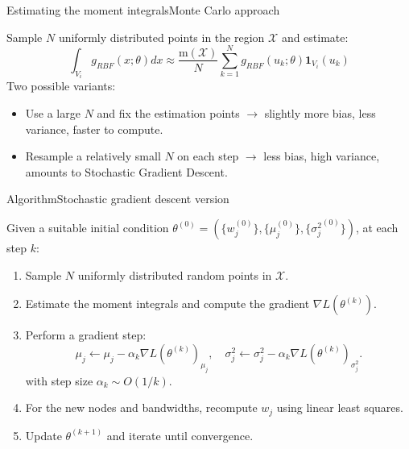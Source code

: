 \documentclass[aspectratio=169]{beamer}
\begin{document}
\begin{frame}{Estimating the moment integrals}{Monte Carlo approach}

	Sample $N$ uniformly distributed points in the region $\mathcal{X}$ and estimate:
	\begin{equation*}
		\int_{V_i} g_{RBF}(x;\theta)dx \approx \frac{\mathrm{m}(\mathcal{X})}{N}\sum_{k=1}^N g_{RBF}(u_k;\theta)\mathbf{1}_{V_i}(u_k)
	\end{equation*}
\pause
	\alert{Two possible variants:}

	\begin{itemize}
		\item Use a large $N$ and fix the estimation points $\to$ slightly more bias, less variance, faster to compute.
		\item Resample a relatively small $N$ on each step $\to$ less bias, high variance, amounts to Stochastic Gradient Descent.
	\end{itemize}
\end{frame}
	
\begin{frame}{Algorithm}{Stochastic gradient descent version}

	Given a suitable initial condition $\theta^{(0)} = (\{w_j^{(0)}\},\{\mu_j^{(0)}\},\{{\sigma_j^2}^{(0)}\})$, at each step $k$:

	\vfill 
	\begin{enumerate}
		\item Sample $N$ uniformly distributed random points in $\mathcal{X}$.
		\item Estimate the moment integrals and compute the gradient $\nabla L(\theta^{(k)})$.
		\item Perform a gradient step:
		\begin{equation*}
		\mu_j \leftarrow \mu_j - \alpha_k 	\nabla L(\theta^{(k)})_{\mu_j}, \quad \sigma_j^2 \leftarrow \sigma_j^2 - \alpha_k 	\nabla L(\theta^{(k)})_{\sigma_j^2}.
		\end{equation*}
		with step size $\alpha_k \sim O(1/k)$.
		\item For the new nodes and bandwidths, recompute $w_j$ using linear least squares.
		\item Update $\theta^{(k+1)}$ and iterate until convergence.
	\end{enumerate}
\end{frame}
\end{document}
